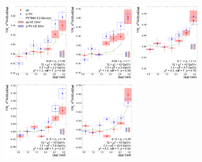 \FloatBarrier
 \begin{figure}
     \centering
     \includegraphics[width=0.3\textwidth]{Data_Analysis/gammahadron/Cs_Final_Indv_pT_0_zT_0.pdf}
    \includegraphics[width=0.3\textwidth]{Data_Analysis/gammahadron/Cs_Final_Indv_pT_0_zT_1.pdf}        
    \includegraphics[width=0.3\textwidth]{Data_Analysis/gammahadron/Cs_Final_Indv_pT_0_zT_2.pdf}        
    \includegraphics[width=0.3\textwidth]{Data_Analysis/gammahadron/Cs_Final_Indv_pT_0_zT_3.pdf}        
    \includegraphics[width=0.3\textwidth]{Data_Analysis/gammahadron/Cs_Final_Indv_pT_0_zT_4.pdf}        

\end{figure}

